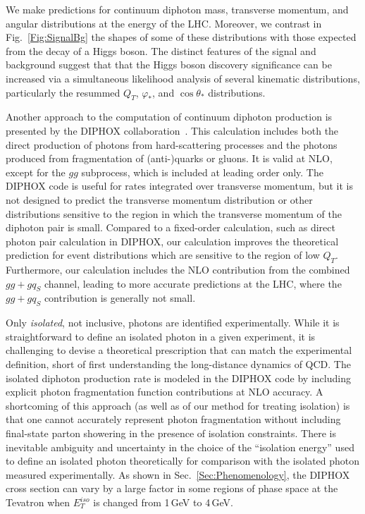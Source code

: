 \documentclass[12pt,english,aps,preprint,prd,letterpaper,fleqn,nofootinbib,showpacs,showkeys,tightenlines,floatfix]{revtex4}
\begin{document}
{We make predictions for continuum diphoton mass, transverse momentum, and angular 
distributions at the energy of the LHC. Moreover, we contrast in Fig.~\ref{Fig:SignalBg} 
the shapes of some of these distributions with those expected from the decay of a 
Higgs boson. The distinct features of the signal and background suggest that   
that the Higgs boson discovery significance can be increased via a simultaneous 
likelihood analysis of several kinematic distributions, particularly the 
resummed $Q_{T}$, $\varphi_{*}$, and $\cos\theta_{*}$ distributions.

Another approach to the computation of continuum diphoton production is 
presented by the \textsc{DIPHOX} collaboration~\cite{Binoth:1999qq}.  This  
calculation includes both the direct production of photons from hard-scattering 
processes and the photons produced from fragmentation of (anti-)quarks or gluons. 
It is valid at NLO, except for the $gg$ subprocess, which is included at leading 
order only. The \textsc{DIPHOX} code is useful for rates integrated 
over transverse momentum, but it is not designed to predict the transverse 
momentum distribution or other distributions 
sensitive to the region in which the transverse momentum of the diphoton pair 
is small.  Compared to a fixed-order calculation, such as direct photon pair 
calculation in \textsc{DIPHOX}, our calculation improves
the theoretical prediction for event distributions which are sensitive
to the region of low $Q_{T}$.   Furthermore, our calculation includes the NLO 
contribution from the combined $gg+gq_{S}$ channel, leading to more accurate 
predictions at the LHC, where the $gg+gq_{S}$ contribution is generally not small.

Only {\em isolated}, not inclusive, photons are identified experimentally. 
While it is straightforward to define an isolated photon in a given experiment, 
it is challenging to devise a theoretical prescription that can match the  
experimental definition, short of first understanding the long-distance dynamics 
of QCD.  The isolated diphoton production rate is modeled in the 
\textsc{DIPHOX} code by including explicit photon fragmentation function 
contributions at 
NLO accuracy.  A shortcoming of this approach (as well as of our method for 
treating isolation) is that one cannot accurately represent 
photon fragmentation without including final-state parton showering in 
the presence of isolation constraints.  There is   
inevitable ambiguity and uncertainty in the choice of the  
``isolation energy'' used to define an isolated photon 
theoretically for comparison with the isolated photon measured experimentally.  
As shown in Sec.~\ref{Sec:Phenomenology}, the \textsc{DIPHOX} cross section 
can vary by a large factor in some regions of phase space at the Tevatron when $E_{T}^{iso}$ 
is changed from 1\,GeV to 4\,GeV.

}
\end{document}
